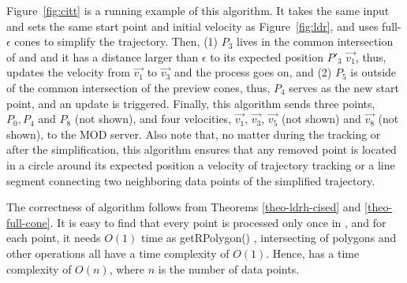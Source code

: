 \begin{example}
	Figure~\ref{fig:citt} is a running example of this algorithm. It takes the same input and sets the same start point and initial velocity as Figure~\ref{fig:ldr}, and uses full-$\epsilon$ cones to simplify the trajectory. Then, (1) $P_3$ lives in the common intersection of  and  and it has a distance larger than $\epsilon$ to its expected position $P'_3$ \wrt $\vec{v_1}$, thus, \citt updates the velocity from $\vec{v_1}$ to $\vec{v_3}$ and the process goes on, and (2) $P_5$ is outside of the common intersection of the preview cones, thus, $P_4$ serves as the new start point, and an update is triggered. Finally, this algorithm sends three points, $P_0, P_4$ and $P_8$ (not shown), and four velocities, $\vec{v_1}$, $\vec{v_3}$, $\vec{v_5}$ (not shown) and $\vec{v_8}$ (not shown), to the MOD server. Also note that, no matter during the tracking or after the simplification, this algorithm ensures that any removed point is located in a circle around its expected position \wrt a velocity of trajectory tracking or a line segment connecting two neighboring data points of the simplified trajectory. 
\end{example}


The correctness of algorithm \citt follows from Theorems \ref{theo-ldrh-cised} and \ref{theo-full-cone}.
It is easy to find that every point is processed only once in \citt, and for each point, it needs $O(1)$ time as getRPolygon() \cite{Lin:Cised}, intersecting of polygons \cite{Lin:Cised} and {other operations} all have a time complexity of $O(1)$. Hence, \citt has a time complexity of $O(n)$, where $n$ is the number of data points.






